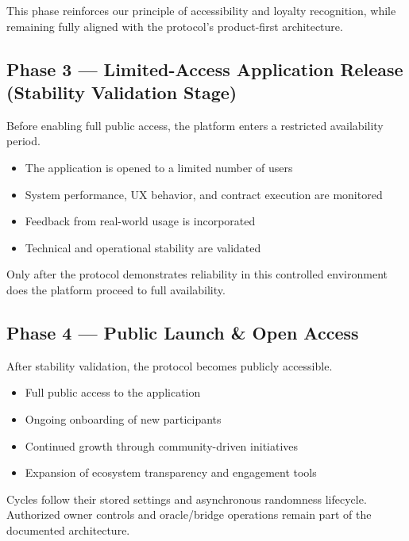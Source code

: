 \documentclass[
  10pt,
  letterpaper,
]{article}
\providecommand{\tightlist}{%
  \setlength{\itemsep}{0pt}\setlength{\parskip}{0pt}}
\begin{document}
This phase reinforces our principle of accessibility and loyalty
recognition, while remaining fully aligned with the protocol's
product-first architecture.

\subsection{Phase 3 --- Limited-Access Application Release (Stability
Validation
Stage)}\label{phase-3-limited-access-application-release-stability-validation-stage}

Before enabling full public access, the platform enters a restricted
availability period.

\begin{itemize}
\tightlist
\item
  The application is opened to a limited number of users
\item
  System performance, UX behavior, and contract execution are monitored
\item
  Feedback from real-world usage is incorporated
\item
  Technical and operational stability are validated
\end{itemize}

Only after the protocol demonstrates reliability in this controlled
environment does the platform proceed to full availability.

\subsection{Phase 4 --- Public Launch \& Open
Access}\label{phase-4-public-launch-open-access}

After stability validation, the protocol becomes publicly accessible.

\begin{itemize}
\tightlist
\item
  Full public access to the application
\item
  Ongoing onboarding of new participants
\item
  Continued growth through community-driven initiatives
\item
  Expansion of ecosystem transparency and engagement tools
\end{itemize}

Cycles follow their stored settings and asynchronous randomness
lifecycle. Authorized owner controls and oracle/bridge operations remain
part of the documented architecture.
\end{document}
